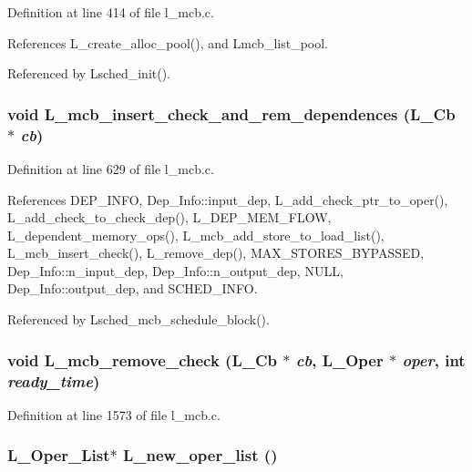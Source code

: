 Definition at line 414 of file l\_\-mcb.c.

References L\_\-create\_\-alloc\_\-pool(), and Lmcb\_\-list\_\-pool.

Referenced by Lsched\_\-init().
\subsubsection{\setlength{\rightskip}{0pt plus 5cm}void L\_\-mcb\_\-insert\_\-check\_\-and\_\-rem\_\-dependences (L\_\-Cb $\ast$ {\em cb})}\label{l__mcb_8h_b74980959bae37f721bec075fe9171ba}




Definition at line 629 of file l\_\-mcb.c.

References DEP\_\-INFO, Dep\_\-Info::input\_\-dep, L\_\-add\_\-check\_\-ptr\_\-to\_\-oper(), L\_\-add\_\-check\_\-to\_\-check\_\-dep(), L\_\-DEP\_\-MEM\_\-FLOW, L\_\-dependent\_\-memory\_\-ops(), L\_\-mcb\_\-add\_\-store\_\-to\_\-load\_\-list(), L\_\-mcb\_\-insert\_\-check(), L\_\-remove\_\-dep(), MAX\_\-STORES\_\-BYPASSED, Dep\_\-Info::n\_\-input\_\-dep, Dep\_\-Info::n\_\-output\_\-dep, NULL, Dep\_\-Info::output\_\-dep, and SCHED\_\-INFO.

Referenced by Lsched\_\-mcb\_\-schedule\_\-block().
\subsubsection{\setlength{\rightskip}{0pt plus 5cm}void L\_\-mcb\_\-remove\_\-check (L\_\-Cb $\ast$ {\em cb}, L\_\-Oper $\ast$ {\em oper}, int {\em ready\_\-time})}\label{l__mcb_8h_86fbe77057384630ecf6336d91ed3fc5}




Definition at line 1573 of file l\_\-mcb.c.
\subsubsection{\setlength{\rightskip}{0pt plus 5cm}L\_\-Oper\_\-List$\ast$ L\_\-new\_\-oper\_\-list ()}\label{l__mcb_8h_8449c9f6ad25a217fd5bc0cffc96eeb2}




